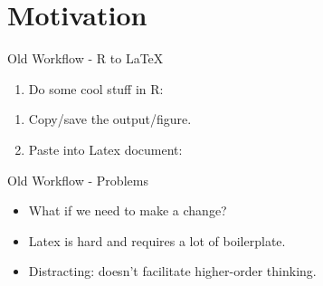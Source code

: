 \section{Motivation}\label{motivation}

\begin{frame}[fragile]{Old Workflow - R to \LaTeX}

\begin{enumerate}
\def\labelenumi{\arabic{enumi}.}
\itemsep1pt\parskip0pt
\item
  Do some cool stuff in R:
\end{enumerate}

\begin{Shaded}
\begin{Highlighting}[]
\StringTok{ } 
\end{Highlighting}
\end{Shaded}

\begin{enumerate}
\def\labelenumi{\arabic{enumi}.}
\setcounter{enumi}{1}
\item
  Copy/save the output/figure.
\item
  Paste into Latex document:
\end{enumerate}

\begin{Shaded}
\begin{Highlighting}[]
\StringTok{ } 
\end{Highlighting}
\end{Shaded}

\end{frame}

\begin{frame}{Old Workflow - Problems}

\begin{itemize}
\item
  What if we need to make a change?
\item
  Latex is hard and requires a lot of boilerplate.
\item
  Distracting: doesn't facilitate higher-order thinking.
\end{itemize}

\end{frame}

